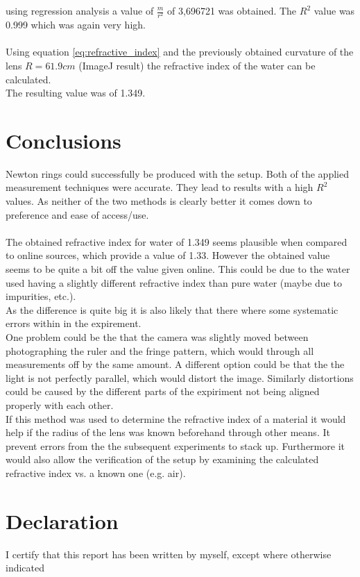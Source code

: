 \documentclass[12pt]{article}
\begin{document}
using regression analysis a value of $\frac{m}{r^2}$ of 3,696721 was obtained. The $R^2$ value was 0.999 which was again very high.\\
\\
Using equation \ref{eq:refractive_index} and the previously obtained curvature of the lens $R = 61.9cm$ (ImageJ result) the refractive index
of the water can be calculated.\\
The resulting value was of 1.349.

\section{Conclusions}

Newton rings could successfully be produced with the setup. Both of the applied measurement techniques were
accurate. They lead to results with a high $R^2$ values. As neither of the two methods is clearly better it comes
down to preference and ease of access/use. \\
\\
The obtained refractive index for water of 1.349 seems plausible when compared to online sources, which provide a 
value of 1.33\autocite{rii}. However the obtained value seems to be quite a bit off the value given online. This could
be due to the water used having a slightly different refractive index than pure water (maybe due to impurities, etc.).\\
As the difference is quite big it is also likely that there where some systematic errors within in the expirement.\\
One problem could be the that the camera was slightly moved between photographing the ruler and the fringe pattern, which
would through all measurements off by the same amount. A different option could be that the the light is not perfectly
parallel, which would distort the image. Similarly distortions could be caused by the different parts of the expiriment not
being aligned properly with each other.\\
If this method was used to determine the refractive index of a material it would help if the radius of the lens was known
beforehand through other means. It prevent errors from the the subsequent experiments to stack up. Furthermore it would also
allow the verification of the setup by examining the calculated refractive index vs. a known one (e.g. air).

\section{Declaration}
I certify that this report has been written by myself, except where otherwise
indicated

\printbibliography
\end{document}

